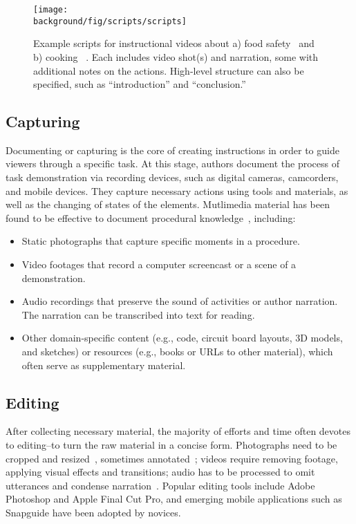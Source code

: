 \begin{figure*}[th!]
  \centering
  \texttt{[image: \\background/fig/scripts/scripts]}
  \caption{Example scripts for instructional videos about a) food safety~\protect\cite{WisconsinFoodSafetyScript} and b) cooking ~\protect\cite{SouthernIllinoisScript}. Each includes video shot(s) and narration, some with additional notes on the actions. High-level structure can also be specified, such as ``introduction'' and ``conclusion.''}
  \label{fig:background_scripts}
\end{figure*}

\subsection{Capturing}
Documenting or capturing is the core of creating instructions in order to guide viewers through a specific task. At this stage, authors document the process of task demonstration via recording devices, such as digital cameras, camcorders, and mobile devices. They capture necessary actions using tools and materials, as well as the changing of states of the elements. %
%
Mutlimedia material has been found to be effective to document procedural knowledge~\cite{Kuznetsov:2010:REA:1868914.1868950,Wakkary:2015:TAH:2702123.2702550}, including:

\begin{itemize}
  \item Static photographs that capture specific moments in a procedure.
  \item Video footages that record a computer screencast or a scene of a demonstration.
  \item Audio recordings that preserve the sound of activities or author narration. The narration can be transcribed into text for reading.
  \item Other domain-specific content (e.g., code, circuit board layouts, 3D models, and sketches) or resources (e.g., books or URLs to other material), which often serve as supplementary material.
\end{itemize}

\subsection{Editing}
After collecting necessary material, the majority of efforts and time often devotes to editing--to turn the raw material in a concise form.
Photographs need to be cropped and resized~\cite{Tseng:2014:PVP:2598510.2598540}, sometimes annotated~\cite{Torrey:2007he}; videos require removing footage, applying visual effects and transitions; audio has to be processed to omit utterances and condense narration~\cite{Chi:2013:DGC:2501988.2502052}. Popular editing tools include Adobe Photoshop and Apple Final Cut Pro, and emerging mobile applications such as Snapguide have been adopted by novices.

